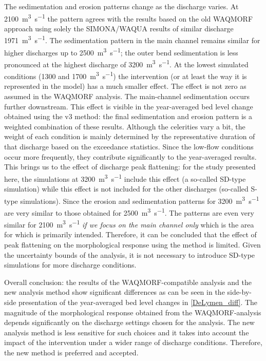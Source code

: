 The sedimentation and erosion patterns change as the discharge varies.
At \SI{2100}{\metre\cubed\per\second} the pattern agrees with the results based on the old WAQMORF approach using solely the SIMONA/WAQUA results of similar discharge \SI{1971}{\metre\cubed\per\second}.
The sedimentation pattern in the main channel remains similar for higher discharges up to \SI{2500}{\metre\cubed\per\second}; the outer bend sedimentation is less pronounced at the highest discharge of \SI{3200}{\metre\cubed\per\second}.
At the lowest simulated conditions (1300 and \SI{1700}{\metre\cubed\per\second}) the intervention (or at least the way it is represented in the model) has a much smaller effect.
The effect is not zero as assumed in the WAQMORF analysis.
The main-channel sedimentation occurs further downstream.
This effect is visible in the year-averaged bed level change obtained using the \dfmi v3 method: the final sedimentation and erosion pattern is a weighted combination of these results.
Although the celerities vary a bit, the weight of each condition is mainly determined by the representative duration of that discharge based on the exceedance statistics.
Since the low-flow conditions occur more frequently, they contribute significantly to the year-averaged results.
This brings us to the effect of discharge peak flattening: for the study presented here, the simulations at \SI{3200}{\metre\cubed\per\second} include this effect (a so-called SD-type simulation) while this effect is not included for the other discharges (so-called S-type simulations).
Since the erosion and sedimentation patterns for \SI{3200}{\metre\cubed\per\second} are very similar to those obtained for \SI{2500}{\metre\cubed\per\second}.
The patterns are even very similar for \SI{2100}{\metre\cubed\per\second} \emph{if we focus on the main channel only} which is the area for which \dfmi is primarily intended.
Therefore, it can be concluded that the effect of peak flattening on the morphological response using the \dfmi method is limited.
Given the uncertainty bounds of the \dfmi analysis, it is not necessary to introduce SD-type simulations for more discharge conditions.

Overall conclusion: the results of the WAQMORF-compatible analysis and the new analysis method show significant differences as can be seen in the side-by-side presentation of the year-averaged bed level changes in \autoref{DeLymen_diff}.
The magnitude of the morphological response obtained from the WAQMORF-analysis depends significantly on the discharge settings chosen for the analysis.
The new analysis method is less sensitive for such choices and it takes into account the impact of the intervention under a wider range of discharge conditions.
Therefore, the new method is preferred and accepted.

